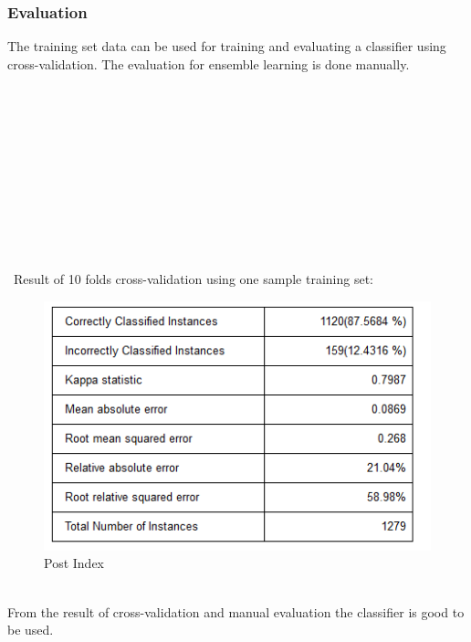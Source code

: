 \subsubsection*{Evaluation}
	The training set data can be used for training and evaluating a classifier using cross-validation. The evaluation for ensemble learning is done manually.\\\\\\\\\\\\\\\\\\\\\\\\\
	Result of 10 folds cross-validation using one sample training set:
	\begin{figure}[h]
		\begin{center}
			\includegraphics[scale=1]{images/nneval.png}
		\caption{Post Index\label{nneval}}
		\end{center}
	\end{figure}
	\\From the result of cross-validation and manual evaluation the classifier is good to be used.\\

	
	
	